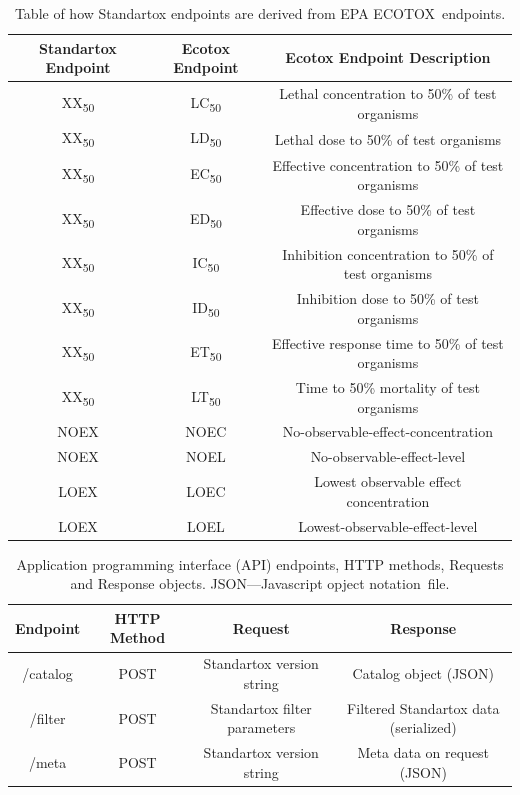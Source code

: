 \documentclass[data,datadescriptor,accept,moreauthors,pdftex]{Definitions/mdpi}
\begin{document}
\begin{table}[H]
    \caption{Table of how Standartox endpoints are derived from EPA ECOTOX~endpoints.}
    \label{tab:endpoints-conflate}
    \centering
\begin{tabular}{ccc}
    \toprule
    \textbf{Standartox Endpoint} & \textbf{Ecotox Endpoint} & \textbf{Ecotox Endpoint Description} \\
    \midrule
    XX\textsubscript{50} & LC\textsubscript{50} & Lethal concentration to 50\% of test organisms \\
    XX\textsubscript{50} & LD\textsubscript{50} & Lethal dose to 50\% of test organisms \\
    XX\textsubscript{50} & EC\textsubscript{50} & Effective concentration to 50\% of test organisms \\
    XX\textsubscript{50} & ED\textsubscript{50} & Effective dose to 50\% of test organisms \\
    XX\textsubscript{50} & IC\textsubscript{50} & Inhibition concentration to 50\% of test organisms \\
    XX\textsubscript{50} & ID\textsubscript{50} & Inhibition dose to 50\% of test organisms \\
    XX\textsubscript{50} & ET\textsubscript{50} & Effective response time to 50\% of test organisms \\
    XX\textsubscript{50} & LT\textsubscript{50} & Time to 50\% mortality of test organisms \\
    NOEX & NOEC & No-observable-effect-concentration \\
    NOEX & NOEL & No-observable-effect-level \\
    LOEX & LOEC & Lowest observable effect concentration \\
    LOEX & LOEL & Lowest-observable-effect-level \\
    \bottomrule
\end{tabular}
\end{table}
\unskip

\begin{table}[H]
    \caption{Application programming interface (API) endpoints, HTTP methods, Requests and Response objects. JSON---Javascript opject notation~file.}
    \label{tab:api-endpoints}
    \centering
\begin{tabular}{cccc}
    \toprule
    \textbf{Endpoint} & \textbf{HTTP Method} & \textbf{Request} & \textbf{Response} \\
    \midrule
    /catalog & POST & Standartox version string & Catalog object (JSON) \\
    /filter & POST & Standartox filter parameters & Filtered Standartox data (serialized) \\
    /meta & POST & Standartox version string & Meta data on request (JSON) \\
    \bottomrule
\end{tabular}
\end{table}
\unskip
\end{document}
